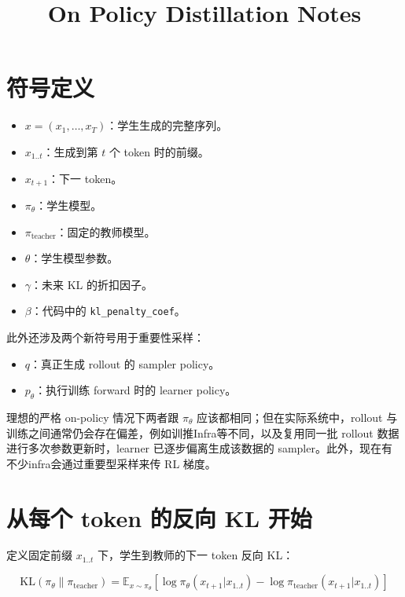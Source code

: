 \documentclass[11pt,a4paper,fontset=fandol]{ctexart}
\title{On Policy Distillation Notes}
\author{}
\date{}
\begin{document}
\maketitle
\tableofcontents
\newpage

\section{符号定义}

\begin{itemize}[leftmargin=2em]
    \item \(x=(x_1,\ldots,x_T)\)：学生生成的完整序列。
    \item \(x_{1..t}\)：生成到第 \(t\) 个 token 时的前缀。
    \item \(x_{t+1}\)：下一 token。
    \item \(\pi_\theta\)：学生模型。
    \item \(\pi_{\text{teacher}}\)：固定的教师模型。
    \item \(\theta\)：学生模型参数。
    \item \(\gamma\)：未来 KL 的折扣因子。
    \item \(\beta\)：代码中的 \texttt{kl\_penalty\_coef}。
\end{itemize}

此外还涉及两个新符号用于重要性采样：

\begin{itemize}[leftmargin=2em]
    \item \(q\)：真正生成 rollout 的 sampler policy。
    \item \(p_\theta\)：执行训练 forward 时的 learner policy。
\end{itemize}

理想的严格 on-policy 情况下两者跟 \(\pi_\theta\) 应该都相同；但在实际系统中，rollout 与训练之间通常仍会存在偏差，例如训推Infra等不同，以及复用同一批 rollout 数据进行多次参数更新时，learner 已逐步偏离生成该数据的 sampler。此外，现在有不少infra会通过重要型采样来传 RL 梯度。
\section{从每个 token 的反向 KL 开始}

定义固定前缀 \(x_{1..t}\) 下，学生到教师的下一 token 反向 KL：

\[
\boxed{
\mathrm{KL}\left(\pi_\theta\|\pi_{\text{teacher}}\right)
=
\mathbb E_{x\sim\pi_\theta}
\left[
\log \pi_\theta(x_{t+1}|x_{1..t})
-
\log \pi_{\text{teacher}}(x_{t+1}|x_{1..t})
\right]
}
\]
\end{document}
